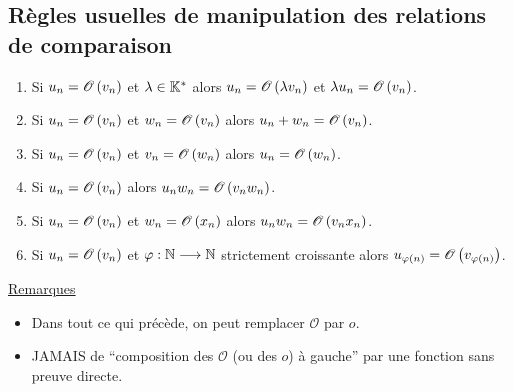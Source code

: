 \subsection{Règles usuelles de manipulation des relations de comparaison}
\begin{defprop}
    \begin{enumerate}
        \item Si \(u_n = \mathscr{O}\left(v_n\right)\) et \(\lambda  \in  \mathbb{K}^*\) alors \(u_n = \mathscr{O}\left(\lambda v_n\right)\) et \(\lambda u_n = \mathscr{O}\left(v_n\right)\).
        \item Si \(u_n = \mathscr{O}\left(v_n\right)\) et \(w_n = \mathscr{O}\left(v_n\right)\) alors \(u_n + w_n = \mathscr{O}\left(v_n\right)\).
        \item Si \(u_n = \mathscr{O}\left(v_n\right)\) et \(v_n = \mathscr{O}\left(w_n\right)\) alors \(u_n = \mathscr{O}\left(w_n\right)\).
        \item Si \(u_n = \mathscr{O}\left(v_n\right)\) alors \(u_nw_n = \mathscr{O}\left(v_nw_n\right)\).
        \item Si \(u_n = \mathscr{O}\left(v_n\right)\) et \(w_n = \mathscr{O}\left(x_n\right)\) alors \(u_nw_n = \mathscr{O}\left(v_nx_n\right)\).
        \item Si \(u_n = \mathscr{O}\left(v_n\right)\) et \(\varphi : \mathbb{N} \longrightarrow \mathbb{N}\) strictement croissante alors \(u_{\varphi(n)} = \mathscr{O}\left(v_{\varphi(n)}\right)\).
    \end{enumerate}
    \underline{Remarques} \\
    \begin{itemize}
        \item Dans tout ce qui précède, on peut remplacer \(\mathscr{O}\) par \(o\).
        \item JAMAIS de “composition des \(\mathscr{O}\) (ou des \(o\)) à gauche” par une fonction sans preuve directe.
    \end{itemize}
\end{defprop}

